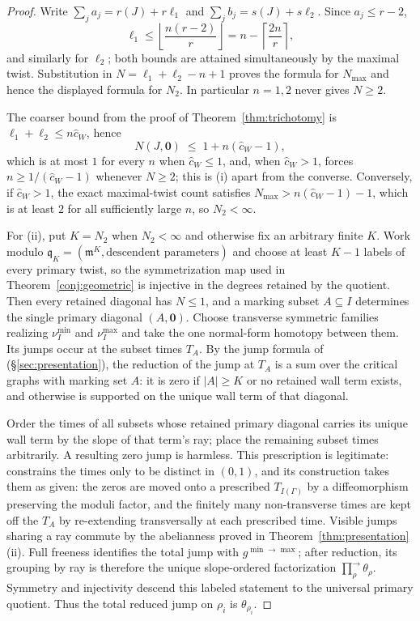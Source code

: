 \documentclass[11pt]{amsart}
\theoremstyle{definition}
\theoremstyle{remark}
\newcommand{\chat}{\hat{c}}
\begin{document}
\begin{proof}
Write $\sum_j a_j=r(J)+r\ell_1$ and
$\sum_j b_j=s(J)+s\ell_2$. Since $a_j\le r-2$,
\[
\ell_1\le\left\lfloor\frac{n(r-2)}r\right\rfloor
=n-\left\lceil\frac{2n}{r}\right\rceil,
\]
and similarly for $\ell_2$; both bounds are attained simultaneously by the
maximal twist. Substitution in
$N=\ell_1+\ell_2-n+1$ proves the formula for $N_{\max}$ and hence the displayed
formula for $N_2$. In particular $n=1,2$ never gives $N\ge2$.

The coarser bound from the proof of Theorem~\ref{thm:trichotomy} is
$\ell_{1}+\ell_{2}\le n\chat_{W}$, hence
\begin{equation}
\label{eq:Nbound}
N(J,\mathbf 0)\;\le\;1+n(\chat_{W}-1),
\end{equation}
which is at most $1$ for every $n$ when $\chat_{W}\le1$, and, when
$\chat_W>1$, forces $n\ge1/(\chat_{W}-1)$ whenever $N\ge2$; this is (i)
apart from the converse.
Conversely, if $\chat_{W}>1$, the exact maximal-twist count satisfies
$N_{\max}>n(\chat_{W}-1)-1$, which is at least $2$ for all sufficiently large
$n$, so $N_{2}<\infty$.

For (ii), put $K=N_2$ when $N_2<\infty$ and otherwise fix an arbitrary finite
$K$. Work modulo $\mathfrak q_K=(\mathfrak m^K,\text{descendent parameters})$ and choose
at least $K-1$ labels of every primary twist, so the symmetrization map used in
Theorem~\ref{conj:geometric} is injective in the degrees retained by the quotient. Then every
retained diagonal has $N\le1$, and a marking subset $A\subseteq I$ determines
the single primary diagonal $(A,\mathbf0)$. Choose transverse symmetric families
realizing $\nu_I^{\min}$ and $\nu_I^{\max}$ and take the one normal-form
homotopy between them. Its jumps occur at the subset times $T_A$. By the jump
formula of \cite[proof of Thm.~5.9]{GKT} (\S\ref{sec:presentation}), the
reduction of the jump at
$T_A$ is a sum over the critical graphs with marking set $A$: it is zero if
$|A|\ge K$ or no retained wall term exists, and otherwise is supported on the
unique wall term of that diagonal.

Order the times of all subsets whose retained primary diagonal carries its
unique wall term by the slope of that term's ray; place the remaining subset
times arbitrarily. A resulting zero jump is harmless. This prescription is legitimate:
\cite[Lem.~3.40]{GKT} constrains the times only to be distinct in $(0,1)$, and its
construction takes them as given: the zeros are moved onto a prescribed
$T_{I(\Gamma)}$ by a diffeomorphism preserving the moduli factor, and the
finitely many non-transverse times are kept off the $T_{A}$ by re-extending
transversally at each prescribed time. Visible jumps sharing a ray commute by the abelianness proved in
Theorem~\ref{thm:presentation}(ii). Full freeness identifies the total jump
with $g^{\min\to\max}$; after reduction, its grouping by ray is therefore the
unique slope-ordered factorization
$\prod^{\rightarrow}_{\rho}\theta_{\rho}$. Symmetry and injectivity descend
this labeled statement to the universal primary quotient. Thus the total
reduced jump on $\rho_i$ is $\theta_{\rho_i}$.
\end{proof}
\end{document}
